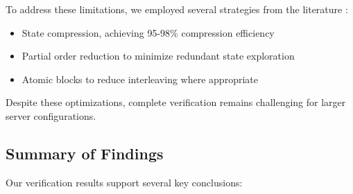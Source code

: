 To address these limitations, we employed several strategies from the literature \cite{Holzmann97, Garavel}:
\begin{itemize}
    \item State compression, achieving 95-98\% compression efficiency
    \item Partial order reduction to minimize redundant state exploration
    \item Atomic blocks to reduce interleaving where appropriate
\end{itemize}

Despite these optimizations, complete verification remains challenging for larger server configurations.

\subsection{Summary of Findings}
\label{sec:findings}
Our verification results support several key conclusions:
